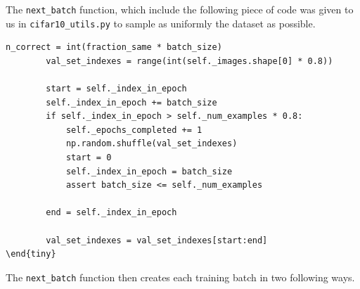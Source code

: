 \documentclass{article}
\begin{document}
The \texttt{next\_batch} function, which include the following piece of code was given to us in \texttt{cifar10\_utils.py} to sample as uniformly the dataset as possible.
\begin{tiny}
\begin{verbatim}
n_correct = int(fraction_same * batch_size)
        val_set_indexes = range(int(self._images.shape[0] * 0.8))

        start = self._index_in_epoch
        self._index_in_epoch += batch_size
        if self._index_in_epoch > self._num_examples * 0.8:
            self._epochs_completed += 1
            np.random.shuffle(val_set_indexes)
            start = 0
            self._index_in_epoch = batch_size
            assert batch_size <= self._num_examples

        end = self._index_in_epoch

        val_set_indexes = val_set_indexes[start:end]
\end{tiny}
\end{verbatim}
\end{tiny}
The \texttt{next\_batch} function then creates each training batch in two following ways.
\end{document}
